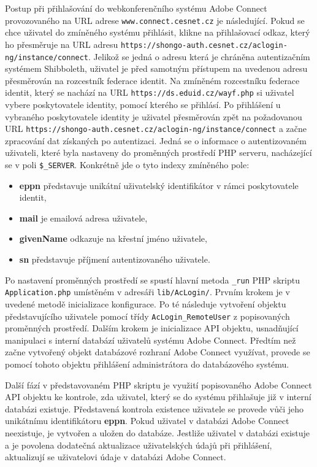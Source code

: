\documentclass[
  printed, %
  twoside, %
  table,   %
  nolof,     %
  nolot,     %
]{fithesis3}
\begin{document}
Postup při přihlašování do webkonferenčního systému Adobe Connect provozovaného na URL adrese \texttt{www.connect.cesnet.cz} je následující. Pokud se chce uživatel do zmíněného systému přihlásit, klikne na přihlašovací odkaz, který ho přesměruje na URL adresu \texttt{https://shongo-auth.cesnet.cz/aclogin-ng/instance/connect}. Jelikož se jedná o adresu která je chráněna autentizačním systémem Shibboleth, uživatel je před samotným přístupem na uvedenou adresu přesměrován na rozcestník federace identit. Na zmíněném rozcestníku federace identit, který se nachází na URL \texttt{https://ds.eduid.cz/wayf.php} si uživatel vybere poskytovatele identity, pomocí kterého se přihlásí. Po přihlášení u vybraného poskytovatele identity je uživatel  přesměrován zpět na požadovanou URL \texttt{https://shongo-auth.cesnet.cz/aclogin-ng/instance/connect} a začne zpracování dat získaných po autentizaci. Jedná se o informace o autentizovaném uživateli, které byla nastaveny do proměnných prostředí PHP serveru, nacházející se v poli \texttt{\$\_SERVER}. Konkrétně jde o tyto indexy zmíněného pole: 

\begin{itemize}
    \item \textbf{eppn} představuje unikátní uživatelský identifikátor v rámci poskytovatele identit, 
    \item \textbf{mail} je emailová adresa uživatele, 
    \item \textbf{givenName} odkazuje na křestní jméno uživatele,
    \item \textbf{sn} představuje příjmení autentizovaného uživatele.
\end{itemize}
\label{item:adobe-connect}
Po nastavení proměnných prostředí se spustí hlavní metoda \texttt{\_run} PHP skriptu \texttt{Application.php} umístěném v adresáři \texttt{lib/AcLogin/}. Prvním krokem je v uvedené metodě inicializace konfigurace. Po té následuje vytvoření objektu představujícího uživatele pomocí třídy \texttt{AcLogin\_RemoteUser} z popisovaných proměnných prostředí. Dalším krokem je inicializace API objektu, usnadňující manipulaci s interní databází uživatelů systému Adobe Connect. Předtím než začne vytvořený objekt databázové rozhraní Adobe Connect využívat, provede se pomocí tohoto objektu přihlášení administrátora do databázového systému. \par 

Další fází v představovaném PHP skriptu je využití popisovaného Adobe Connect API objektu ke kontrole, zda uživatel, který se do systému přihlašuje již v interní databázi existuje. Představená kontrola existence uživatele se provede vůči jeho unikátnímu identifikátoru \textbf{eppn}. Pokud uživatel v databázi Adobe Connect neexistuje, je vytvořen a uložen do databáze. Jestliže uživatel v databázi existuje a je povolena dodatečná aktualizace uživatelských údajů při přihlášení, aktualizují se uživatelovi údaje v databázi Adobe Connect. \par
\end{document}
